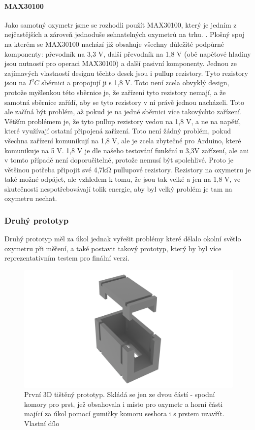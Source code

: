 \paragraph{MAX30100}
Jako samotný oxymetr jsme se rozhodli použít MAX30100, který je jedním z nejčastějších a zároveň jednoduše sehnatelných oxymetrů na trhu. \citep{max30100}. Plošný spoj na kterém se MAX30100 nachází již obsahuje všechny důležité podpůrné komponenty: převodník na 3,3 V, další převodník na 1,8 V (obě napěťové hladiny jsou nutností pro operaci MAX30100) a další pasivní komponenty. Jednou ze zajímavých vlastností designu těchto desek jsou i pullup rezistory. Tyto rezistory jsou na $I^2C$ sběrnici a propojují ji s 1,8 V. Toto není zcela obvyklý design, protože myšlenkou této sběrnice je, že zařízení tyto rezistory nemají, a že samotná sběrnice zařídí, aby se tyto rezistory v ní právě jednou nacházeli. Toto ale začíná být problém, až pokud je na jedné sběrnici více takovýchto zařízení. Větším problémem je, že tyto pullup rezistory vedou na 1,8 V, a ne na napětí, které využívají ostatní připojená zařízení. Toto není žádný problém, pokud všechna zařízení komunikují na 1,8 V, ale je zcela zbytečné pro Arduino, které komunikuje na 5 V. 1,8 V je dle našeho testování funkční u 3,3V zařízení, ale ani v tomto případě není doporučitelné, protože nemusí být spolehlivé. Proto je většinou potřeba připojit své 4,7kΩ pullupové rezistory. Rezistory na oxymetru je také možné odpájet, ale vzhledem k tomu, že jsou tak velké a jen na 1,8 V, ve skutečnosti nespotřebovávají tolik energie, aby byl velký problém je tam na oxymetru nechat.
\subsubsection {Druhý prototyp}
Druhý prototyp měl za úkol jednak vyřešit problémy které dělalo okolní světlo oxymetru při měření, a také postavit takový prototyp, který by byl více reprezentativním testem pro finální verzi.
\begin{figure}[ht]
  \includegraphics[scale=0.13, center]{Kapitoly/Prakticka/Obrazky/Druhý_prototyp2_w.png}
  \caption [3D model druhého prototypu]{První 3D tištěný prototyp. Skládá se jen ze dvou částí - spodní komory pro prst, jež obsahovala i místo pro oxymetr a horní části mající za úkol pomocí gumičky komoru seshora i s prstem uzavřít. Vlastní dílo}
  \label{fig:3D_model_druhého_prototypu}
\end{figure}
